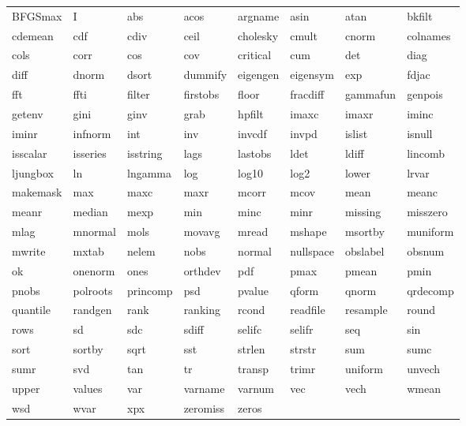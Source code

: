 \begin{tabular}{llllllll}
BFGSmax & I & abs & acos & argname & asin & atan & bkfilt \\
cdemean & cdf & cdiv & ceil & cholesky & cmult & cnorm & colnames \\
cols & corr & cos & cov & critical & cum & det & diag \\
diff & dnorm & dsort & dummify & eigengen & eigensym & exp & fdjac \\
fft & ffti & filter & firstobs & floor & fracdiff & gammafun & genpois \\
getenv & gini & ginv & grab & hpfilt & imaxc & imaxr & iminc \\
iminr & infnorm & int & inv & invcdf & invpd & islist & isnull \\
isscalar & isseries & isstring & lags & lastobs & ldet & ldiff & lincomb \\
ljungbox & ln & lngamma & log & log10 & log2 & lower & lrvar \\
makemask & max & maxc & maxr & mcorr & mcov & mean & meanc \\
meanr & median & mexp & min & minc & minr & missing & misszero \\
mlag & mnormal & mols & movavg & mread & mshape & msortby & muniform \\
mwrite & mxtab & nelem & nobs & normal & nullspace & obslabel & obsnum \\
ok & onenorm & ones & orthdev & pdf & pmax & pmean & pmin \\
pnobs & polroots & princomp & psd & pvalue & qform & qnorm & qrdecomp \\
quantile & randgen & rank & ranking & rcond & readfile & resample & round \\
rows & sd & sdc & sdiff & selifc & selifr & seq & sin \\
sort & sortby & sqrt & sst & strlen & strstr & sum & sumc \\
sumr & svd & tan & tr & transp & trimr & uniform & unvech \\
upper & values & var & varname & varnum & vec & vech & wmean \\
wsd & wvar & xpx & zeromiss & zeros & \\
\end{tabular}


